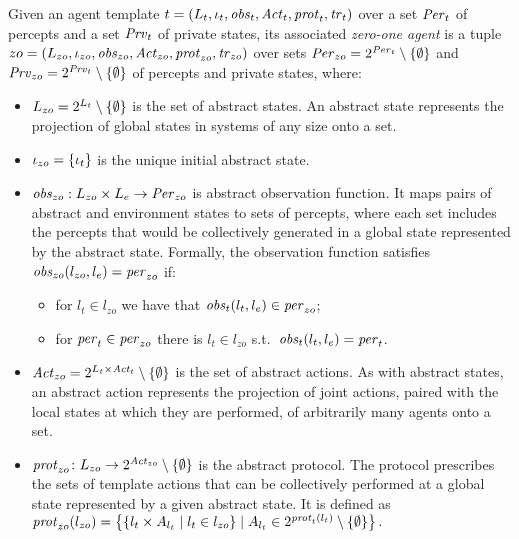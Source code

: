 \begin{definition}
Given an agent template ${t} = \left ( L_{t}, \iota_{t}, \mathit{obs}_{t},  \mathit{Act}_{t},
\mathit{prot}_{t}, \mathit{tr}_{t}  \right )$ over a set $\mathit{Per}_{t}$ of percepts and a set $\mathit{Prv}_{t}$ of
private states, its associated \emph{zero-one agent} is a tuple ${zo} =
\left ( L_{zo}, \iota_{zo}, \mathit{obs}_{zo}, \mathit{Act}_{zo}, \mathit{prot}_{zo}, \mathit{tr}_{zo} \right )$ over
sets $\mathit{Per}_{zo} = 2^{\mathit{Per}_{t}} \setminus \left \{ \emptyset \right \}$ and $\mathit{Prv}_{zo}=
2^{\mathit{Prv}_{t}} \setminus \left \{ \emptyset \right \}$ of percepts and private states, where:
\begin{itemize}[$\bullet$]\itemsep 0cm
    \item $L_{zo} = 2^{L_{t}} \setminus \left \{ \emptyset \right \}$ is the set
    of abstract states. An abstract state represents the projection of global
    states in systems of any size onto a set.

    \item $\iota_{zo} = \left \{ \iota_{t} \right \}$ is the unique initial abstract state.
    
    \item $\mathit{obs}_{zo} : L_{zo} \times L_{e} \rightarrow \mathit{Per}_{zo}$ is
    abstract observation function. It maps pairs of abstract and environment
    states to sets of percepts, where each set includes the percepts that would
    be collectively generated in a global state represented by the abstract
    state. Formally, the observation function satisfies $\mathit{obs}_{zo}(l_{zo}, l_e) =
    \mathit{per}_{zo}$ if:
    \begin{itemize}[\textbf{--}]
    \item for $l_t \in l_{zo}$ we have that $\mathit{obs}_{t}(l_t, l_e) \in \mathit{per}_{zo}$;
      \item for $\mathit{per}_{t} \in \mathit{per}_{zo}$ there is $l_t \in l_{zo}$ s.t.\
        $\mathit{obs}_{t}(l_t, l_e) = \mathit{per}_{t}$.
    \end{itemize}

    \item $\mathit{Act}_{zo} = 2^{L_{t} \times \mathit{Act}_{t}} \setminus \left \{ \emptyset \right \}$
    is the set of abstract actions. As with abstract states, an abstract
    action represents the projection of joint actions, paired with the local
    states at which they are performed, of arbitrarily many agents onto a set.

    \item $\mathit{prot}_{zo} \colon L_{zo} \rightarrow 2^{\mathit{Act}_{zo}} \setminus
    \left \{ \emptyset \right \}$ is the abstract protocol. The protocol prescribes the sets
    of template actions that can be collectively performed at a global state
    represented by a given abstract state. It is defined as $\mathit{prot}_{zo}(l_{zo})
    = \left \{  \left \{ l_t \times A_{l_t} \mid l_t \in l_{zo} \right \} \mid A_{l_t} \in
    2^{\mathit{prot}_{t}(l_t)} \setminus \left \{ \emptyset \right \} \right \}.$


\end{itemize}
\end{definition}
